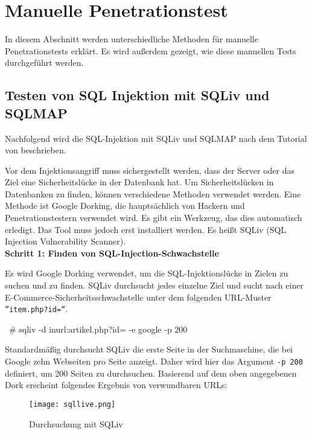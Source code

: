 \section{Manuelle Penetrationstest}

In diesem Abschnitt werden unterschiedliche Methoden für manuelle Penetrationstests erklärt. Es wird außerdem gezeigt, wie diese manuellen Tests durchgeführt werden.

\subsection{Testen von SQL Injektion mit SQLiv und SQLMAP}

Nachfolgend wird die SQL-Injektion mit SQLiv und SQLMAP nach dem Tutorial von \cite{ramadhan17sqlinj} beschrieben.

Vor dem Injektionsangriff muss sichergestellt werden, dass der Server oder das Ziel eine Sicherheitslücke in der Datenbank hat. Um Sicherheitslücken in Datenbanken zu finden, können verschiedene Methoden verwendet werden. Eine Methode ist Google Dorking, die hauptsächlich von Hackern und Penetrationstestern verwendet wird. Es gibt ein Werkzeug, das dies automatisch erledigt. Das Tool muss jedoch erst installiert werden. Es heißt SQLiv (SQL Injection Vulnerability Scanner).\\

\textbf{Schritt 1: Finden von SQL-Injection-Schwachstelle}

Es wird Google Dorking verwendet, um die SQL-Injektionslücke in Zielen zu suchen und zu finden. SQLiv durchsucht jedes einzelne Ziel und sucht nach einer E-Commerce-Sicherheitsschwachstelle unter dem folgenden URL-Muster \texttt{''item.php?id=''}.\\

\begin{LaTeXCode}[caption={Google Dorking mit SQLiv \cite{ramadhan17sqlinj}},captionpos=b, label=LaTeXCode:gdsqliv][numbers=none]
~# sqliv -d inurl:artikel.php?id= -e google -p 200
\end{LaTeXCode}

Standardmäßig durchsucht SQLiv die erste Seite in der Suchmaschine, die bei Google zehn Webseiten pro Seite anzeigt. Daher wird hier das Argument \texttt{-p 200} definiert, um 200 Seiten zu durchsuchen. Basierend auf dem oben angegebenen Dork erscheint folgendes Ergebnis von verwundbaren URLs:

\begin{figure}[h]
	\centering
	\texttt{[image: sqllive.png]}
	\caption{Durchsuchung mit SQLiv}
\end{figure}

